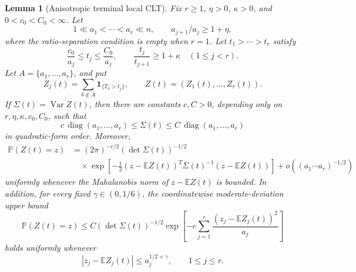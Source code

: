\documentclass[11pt]{article}
\newtheorem{lemma}[theorem]{Lemma}
\theoremstyle{remark}
\newcommand{\Pp}{\mathbb P}
\newcommand{\Ee}{\mathbb E}
\newcommand{\one}{\mathbf 1}
\newcommand{\Var}{\operatorname{Var}}
\newcommand{\diag}{\operatorname{diag}}
\begin{document}
\begin{lemma}[Anisotropic terminal local CLT]\label{lem:terminal-llt}
Fix \(r\ge1\), \(\eta>0\), \(\kappa>0\), and \(0<c_0<C_0<\infty\).  Let
\[
        1\ll a_1<\cdots<a_r\ll n,
        \qquad a_{j+1}/a_j\ge1+\eta,
\]
where the ratio-separation condition is empty when \(r=1\).  Let
\(t_1>\cdots>t_r\) satisfy
\[
        \frac{c_0}{a_j}\le t_j\le \frac{C_0}{a_j},
        \qquad
        \frac{t_j}{t_{j+1}}\ge1+\kappa
        \quad (1\le j<r).
\]
Let \(A=\{a_1,\ldots,a_r\}\), and put
\[
        Z_j(t)=\sum_{b\notin A}\one_{\{T_b>t_j\}},
        \qquad Z(t)=(Z_1(t),\ldots,Z_r(t)).
\]
If \(\Sigma(t)=\Var Z(t)\), then there are constants \(c,C>0\), depending only on \(r,\eta,\kappa,c_0,C_0\), such that
\[
        c\,\diag(a_1,\ldots,a_r)
        \le \Sigma(t)\le
        C\,\diag(a_1,\ldots,a_r)
\]
in quadratic-form order.  Moreover,
\[
\begin{aligned}
        \Pp(Z(t)=z)
        &=(2\pi)^{-r/2}(\det\Sigma(t))^{-1/2} \\
        &\quad\times
        \exp\left[-\frac12(z-\Ee Z(t))^T\Sigma(t)^{-1}(z-\Ee Z(t))\right]
        +o\left((a_1\cdots a_r)^{-1/2}\right)
\end{aligned}
\]
uniformly whenever the Mahalanobis norm of \(z-\Ee Z(t)\) is bounded.  In addition, for every fixed \(\gamma\in(0,1/6)\), the coordinatewise moderate-deviation upper bound
\[
        \Pp(Z(t)=z)
        \le C(\det\Sigma(t))^{-1/2}
        \exp\left[-c\sum_{j=1}^r
        \frac{(z_j-\Ee Z_j(t))^2}{a_j}\right]
\]
holds uniformly whenever
\[
        |z_j-\Ee Z_j(t)|\le a_j^{1/2+\gamma},
        \qquad 1\le j\le r .
\]
\end{lemma}
\end{document}
